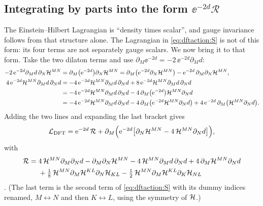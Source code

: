 \subsection{Integrating by parts into the form \texorpdfstring{$\ee^{-2d}\mathcal R$}{exp(-2d) R}}
The Einstein--Hilbert Lagrangian is ``density times scalar'', and gauge invariance follows from
that structure alone. The Lagrangian in \eqref{eq:dftaction:S} is not of this form: its four terms
are not separately gauge scalars. We now bring it to that form. Take the two dilaton terms and
use $\partial_M\ee^{-2d}=-2\,\ee^{-2d}\partial_Md$:
\begin{align}
-2\,\mathrm{e}^{-2d}\partial_Md\,\partial_N\mathcal{H}^{MN}
 &=\partial_M\bigl(\mathrm{e}^{-2d}\bigr)\partial_N\mathcal{H}^{MN}
 =\partial_M\bigl(\mathrm{e}^{-2d}\partial_N\mathcal{H}^{MN}\bigr)-\mathrm{e}^{-2d}\,\partial_M\partial_N\mathcal{H}^{MN},
 \label{eq:dftaction:ibp1}\\
4\,\mathrm{e}^{-2d}\mathcal{H}^{MN}\partial_Md\,\partial_Nd
 &=-4\,\mathrm{e}^{-2d}\mathcal{H}^{MN}\partial_Md\,\partial_Nd+8\,\mathrm{e}^{-2d}\mathcal{H}^{MN}\partial_Md\,\partial_Nd
 \notag\\
 &=-4\,\mathrm{e}^{-2d}\mathcal{H}^{MN}\partial_Md\,\partial_Nd-4\,\partial_M\bigl(\mathrm{e}^{-2d}\bigr)\mathcal{H}^{MN}
 \partial_Nd\notag\\
 &=-4\,\mathrm{e}^{-2d}\mathcal{H}^{MN}\partial_Md\,\partial_Nd-4\,\partial_M\bigl(\mathrm{e}^{-2d}\mathcal{H}^{MN}\partial_Nd
 \bigr)+4\,\mathrm{e}^{-2d}\,\partial_M\bigl(\mathcal{H}^{MN}\partial_Nd\bigr).\label{eq:dftaction:ibp2}
\end{align}
Adding the two lines and expanding the last bracket gives
\begin{equation}\label{eq:dftaction:LR}
\mathcal L_{\text{DFT}}=\mathrm{e}^{-2d}\,\mathcal R+\partial_M\Bigl(\mathrm{e}^{-2d}\bigl[\partial_N\mathcal{H}^{MN}
-4\,\mathcal{H}^{MN}\partial_Nd\bigr]\Bigr),
\end{equation}
with
\begin{equation}\label{eq:dftaction:R}
\begin{aligned}
\mathcal R={}&4\,\mathcal{H}^{MN}\partial_M\partial_Nd-\partial_M\partial_N\mathcal{H}^{MN}
-4\,\mathcal{H}^{MN}\partial_Md\,\partial_Nd+4\,\partial_M\mathcal{H}^{MN}\partial_Nd\\
&+\tfrac18\,\mathcal{H}^{MN}\partial_M\mathcal{H}^{KL}\partial_N\mathcal{H}_{KL}
-\tfrac12\,\mathcal{H}^{MN}\partial_M\mathcal{H}^{KL}\partial_K\mathcal{H}_{NL}
\end{aligned}
\end{equation}
.
(The last term is the second term of \eqref{eq:dftaction:S} with its dummy indices renamed,
$M\leftrightarrow N$ and then $K\leftrightarrow L$, using the symmetry of $\mathcal{H}$.)

